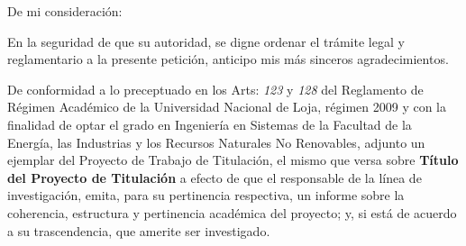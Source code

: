 \documentclass[12pt,a4paper,sans]{moderncv}
\newcommand{\titulo}{Título del Proyecto de Titulación}
\begin{document}
\date{Loja, 24 de agosto del 2020}
\opening{De mi consideración:}
\closing{En la seguridad de que su autoridad, se digne ordenar el trámite legal y reglamentario a la presente petición, anticipo mis más sinceros agradecimientos.}
\makelettertitle

De conformidad a lo preceptuado en los Arts: \textit{123} y \textit{128} del Reglamento de Régimen Académico de la Universidad Nacional de Loja, régimen 2009 y con la finalidad de optar el grado en Ingeniería en Sistemas de la Facultad de la Energía, las Industrias y los Recursos Naturales No Renovables, adjunto un ejemplar del Proyecto de Trabajo de Titulación, el mismo que versa sobre \textbf{\titulo} a efecto de que el responsable de la línea de investigación, emita, para su pertinencia respectiva, un informe sobre la coherencia, estructura y pertinencia académica del proyecto; y, si está de acuerdo a su trascendencia, que amerite ser investigado.

\makeletterclosing
\end{document}
